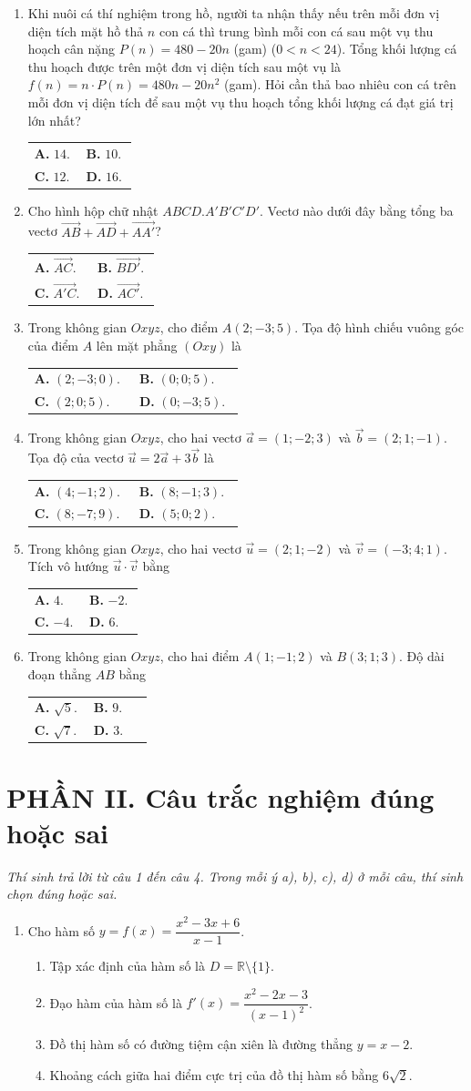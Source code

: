 \documentclass[12pt,a4paper]{article}
\makeatletter
\newcommand{\bonpa}[4]{\par\nobreak\smallskip\nobreak\noindent
\begin{tabular}{@{}p{0.47\linewidth}p{0.47\linewidth}@{}}
\textbf{A.} #1 & \textbf{B.} #2\\[8pt]
\textbf{C.} #3 & \textbf{D.} #4\end{tabular}}
\makeatother
\begin{document}
\newpage
\begin{enumerate}[start=7]
\item Khi nuôi cá thí nghiệm trong hồ, người ta nhận thấy nếu trên mỗi đơn vị diện tích mặt hồ thả $n$ con cá thì trung bình mỗi con cá sau một vụ thu hoạch cân nặng $P(n)=480-20n$ (gam) ($0<n<24$). Tổng khối lượng cá thu hoạch được trên một đơn vị diện tích sau một vụ là $f(n)=n\cdot P(n)=480n-20n^2$ (gam). Hỏi cần thả bao nhiêu con cá trên mỗi đơn vị diện tích để sau một vụ thu hoạch tổng khối lượng cá đạt giá trị lớn nhất?
\bonpa{$14$.}{$10$.}{$12$.}{$16$.}

\item Cho hình hộp chữ nhật $ABCD.A'B'C'D'$. Vectơ nào dưới đây bằng tổng ba vectơ $\vec{AB}+\vec{AD}+\vec{AA'}$?
\bonpa{$\vec{AC}$.}{$\vec{BD'}$.}{$\vec{A'C}$.}{$\vec{AC'}$.}

\item Trong không gian $Oxyz$, cho điểm $A(2;-3;5)$. Tọa độ hình chiếu vuông góc của điểm $A$ lên mặt phẳng $(Oxy)$ là
\bonpa{$(2;-3;0)$.}{$(0;0;5)$.}{$(2;0;5)$.}{$(0;-3;5)$.}

\item Trong không gian $Oxyz$, cho hai vectơ $\vec{a}=(1;-2;3)$ và $\vec{b}=(2;1;-1)$. Tọa độ của vectơ $\vec{u}=2\vec{a}+3\vec{b}$ là
\bonpa{$(4;-1;2)$.}{$(8;-1;3)$.}{$(8;-7;9)$.}{$(5;0;2)$.}

\item Trong không gian $Oxyz$, cho hai vectơ $\vec{u}=(2;1;-2)$ và $\vec{v}=(-3;4;1)$. Tích vô hướng $\vec{u}\cdot\vec{v}$ bằng
\bonpa{$4$.}{$-2$.}{$-4$.}{$6$.}

\item Trong không gian $Oxyz$, cho hai điểm $A(1;-1;2)$ và $B(3;1;3)$. Độ dài đoạn thẳng $AB$ bằng
\bonpa{$\sqrt{5}$.}{$9$.}{$\sqrt{7}$.}{$3$.}
\end{enumerate}

\vspace{3pt}
\section*{\large PHẦN II. Câu trắc nghiệm đúng hoặc sai}
\textit{Thí sinh trả lời từ câu 1 đến câu 4. Trong mỗi ý a), b), c), d) ở mỗi câu, thí sinh chọn đúng hoặc sai.}
\begin{enumerate}
\item Cho hàm số $y=f(x)=\dfrac{x^2-3x+6}{x-1}$.
\begin{enumerate}
\item Tập xác định của hàm số là $D=\mathbb{R}\setminus\{1\}$.
\item Đạo hàm của hàm số là $f'(x)=\dfrac{x^2-2x-3}{(x-1)^2}$.
\item Đồ thị hàm số có đường tiệm cận xiên là đường thẳng $y=x-2$.
\item Khoảng cách giữa hai điểm cực trị của đồ thị hàm số bằng $6\sqrt{2}$.
\end{enumerate}
\end{enumerate}
\end{document}
